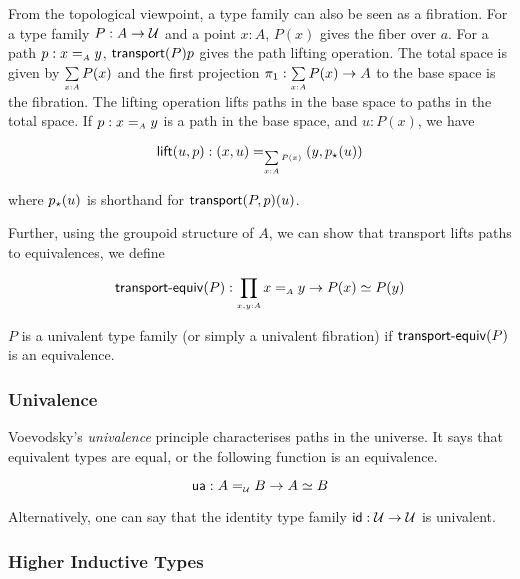 From the topological viewpoint, a type family can also be seen as a fibration. For a type family $P : A \to \mathcal{U}$ and a
point $x : A$, $P(x)$ gives the fiber over $a$. For a path $p : x \id_{A} y$, $\operatorname{\mathsf{transport}}({P}){p}$ gives the path lifting
operation. The total space is given by $\dsum{x:A}{P(x)}$ and the first projection $\pi_1 : \dsum{x:A}{P(x)} \to A$ to
the base space is the fibration. The lifting operation lifts paths in the base space to paths in the total space. If
$p : x \id_{A} y$ is a path in the base space, and $u : P(x)$, we have

\[
  \term{lift}(u,p) : (x , u) \id_{\dsum{x:A}{P(x)}} (y , \tr{p}{u})
\]

where ${p}_{\star}({u})$ is shorthand for $\operatorname{\mathsf{transport}}({P,p})(u)$.

Further, using the groupoid structure of $A$, we can show that transport lifts paths to equivalences, we define

\[
  \tptEqv{P} : \dfun{x,y:A}{x \id_{A} y \to P(x) \eqv P(y)}
\]

\begin{definition}
  $P$ is a univalent type family (or simply a univalent fibration) if $\operatorname{\mathsf{transport-equiv}}({P})$ is an equivalence.
\end{definition}

\subsubsection{Univalence}

Voevodsky's \emph{univalence} principle characterises paths in the universe. It says that equivalent types are equal, or
the following function is an equivalence.

\[
  \ua : A \id_{\UU} B \to A \eqv B
\]

Alternatively, one can say that the identity type family $\operatorname{\mathsf{id}} : \mathcal{U} \to \mathcal{U}$ is univalent.

\subsubsection{Higher Inductive Types}

